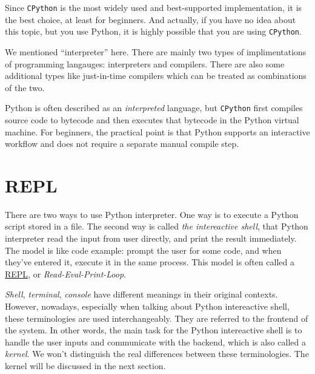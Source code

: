 \documentclass[
  letterpaper,
  DIV=11,
  numbers=noendperiod]{scrreprt}
\theoremstyle{definition}
\theoremstyle{definition}
\theoremstyle{plain}
\theoremstyle{plain}
\theoremstyle{remark}
\begin{document}
Since \texttt{CPython} is the most widely used and best-supported
implementation, it is the best choice, at least for beginners. And
actually, if you have no idea about this topic, but you use Python, it
is highly possible that you are using \texttt{CPython}.

\begin{tcolorbox}[enhanced jigsaw, arc=.35mm, bottomrule=.15mm, bottomtitle=1mm, breakable, colback=white, colbacktitle=quarto-callout-note-color!10!white, colframe=quarto-callout-note-color-frame, coltitle=black, left=2mm, leftrule=.75mm, opacityback=0, opacitybacktitle=0.6, rightrule=.15mm, title=\textcolor{quarto-callout-note-color}{\faInfo}\hspace{0.5em}{Note}, titlerule=0mm, toprule=.15mm, toptitle=1mm]

We mentioned ``interpreter'' here. There are mainly two types of
implimentations of programming langauges: interpreters and compilers.
There are also some additional types like just-in-time compilers which
can be treated as combinations of the two.

Python is often described as an \emph{interpreted} language, but
\texttt{CPython} first compiles source code to bytecode and then
executes that bytecode in the Python virtual machine. For beginners, the
practical point is that Python supports an interactive workflow and does
not require a separate manual compile step.

\end{tcolorbox}

\section{REPL}\label{repl}

There are two ways to use Python interpreter. One way is to execute a
Python script stored in a file. The second way is called \emph{the
intereactive shell}, that Python interpreter read the input from user
directly, and print the result immediately. The model is like code
example: prompt the user for some code, and when they've entered it,
execute it in the same process. This model is often called a
\href{https://en.wikipedia.org/wiki/Read\%E2\%80\%93eval\%E2\%80\%93print_loop}{REPL},
or \emph{Read-Eval-Print-Loop}.

\emph{Shell}, \emph{terminal}, \emph{console} have different meanings in
their original contexts. However, nowadays, especially when talking
about Python intereactive shell, these terminologies are used
interchangeably. They are referred to the frontend of the system. In
other words, the main task for the Python intereactive shell is to
handle the user inputs and communicate with the backend, which is also
called a \emph{kernel}. We won't distinguish the real differences
between these terminologies. The kernel will be discussed in the next
section.
\end{document}

